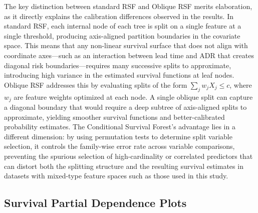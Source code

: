 \documentclass[pdflatex,sn-mathphys-ay]{sn-jnl}
\theoremstyle{thmstyleone}%
\theoremstyle{thmstyletwo}%
\theoremstyle{thmstylethree}%
\begin{document}
The key distinction between standard RSF and Oblique RSF merits elaboration, as it directly explains the calibration differences observed in the results. In standard RSF, each internal node of each tree is split on a single feature at a single threshold, producing axis-aligned partition boundaries in the covariate space. This means that any non-linear survival surface that does not align with coordinate axes—such as an interaction between lead time and ADR that creates diagonal risk boundaries—requires many successive splits to approximate, introducing high variance in the estimated survival functions at leaf nodes. Oblique RSF addresses this by evaluating splits of the form $\sum_j w_j X_j \leq c$, where $w_j$ are feature weights optimized at each node. A single oblique split can capture a diagonal boundary that would require a deep subtree of axis-aligned splits to approximate, yielding smoother survival functions and better-calibrated probability estimates. The Conditional Survival Forest's advantage lies in a different dimension: by using permutation tests to determine split variable selection, it controls the family-wise error rate across variable comparisons, preventing the spurious selection of high-cardinality or correlated predictors that can distort both the splitting structure and the resulting survival estimates in datasets with mixed-type feature spaces such as those used in this study.

\subsection{Survival Partial Dependence Plots}
\end{document}
